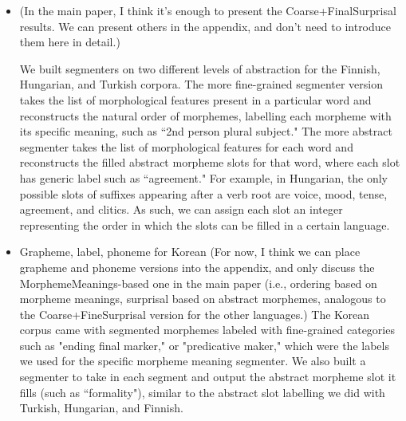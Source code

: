 \documentclass[11pt,letterpaper]{article}
\newcommand\mhahn[1]{{\color{red}(#1)}}
\begin{document}
\begin{itemize}
    \item \mhahn{In the main paper, I think it's enough to present the Coarse+FinalSurprisal results. We can present others in the appendix, and don't need to introduce them here in detail.} %
    
    We built segmenters on two different levels of abstraction for the Finnish, Hungarian, and Turkish corpora. The more fine-grained segmenter version takes the list of morphological features present in a particular word and reconstructs the natural order of morphemes, labelling each morpheme with its specific meaning, such as ``2nd person plural subject." The more abstract segmenter takes the list of morphological features for each word and reconstructs the filled abstract morpheme slots for that word, where each slot has generic label such as ``agreement." For example, in Hungarian, the only possible slots of suffixes appearing after a verb root are voice, mood, tense, agreement, and clitics. As such, we can assign each slot an integer representing the order in which the slots can be filled in a certain language. 
    
    
    \item Grapheme, label, phoneme for Korean \mhahn{For now, I think we can place grapheme and phoneme versions into the appendix, and only discuss the MorphemeMeanings-based one in the main paper (i.e., ordering based on morpheme meanings, surprisal based on abstract morphemes, analogous to the Coarse+FineSurprisal version for the other languages.}
    The Korean corpus came with segmented morphemes labeled with fine-grained categories such as "ending final marker," or "predicative maker," which were the labels we used for the specific morpheme meaning segmenter. We also built a segmenter to take in each segment and output the abstract morpheme slot it fills (such as ``formality"), similar to the abstract slot labelling we did with Turkish, Hungarian, and Finnish. 
  

\end{itemize}
\end{document}
